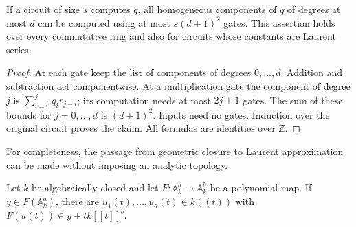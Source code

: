 \begin{lemma}\label{lem:homogeneous-components}
If a circuit of size $s$ computes $q$, all homogeneous components of
$q$ of degrees at most $d$ can be computed using at most
$s(d+1)^2$ gates.  This assertion holds over every commutative ring
and also for circuits whose constants are Laurent series.
\end{lemma}

\begin{proof}
At each gate keep the list of components of degrees $0,\ldots,d$.
Addition and subtraction act componentwise.  At a multiplication
gate the component of degree $j$ is
$\sum_{i=0}^j q_i r_{j-i}$; its computation needs at most $2j+1$
gates.  The sum of these bounds for $j=0,\ldots,d$ is $(d+1)^2$.
Inputs need no gates.  Induction over the original circuit proves
the claim.  All formulas are identities over $\mathbb Z$.
\end{proof}

For completeness, the passage from geometric closure to Laurent
approximation can be made without imposing an analytic topology.

\begin{lemma}
\label{lem:laurent-closure}
Let $k$ be algebraically closed and let $F:\mathbb A^a_k\to
\mathbb A^b_k$ be a polynomial map.  If
$y\in\overline{F(\mathbb A^a_k)}$, there are
$u_1(t),\ldots,u_a(t)\in k((t))$ with
$F(u(t))\in y+t k[[t]]^b$.
\end{lemma}

